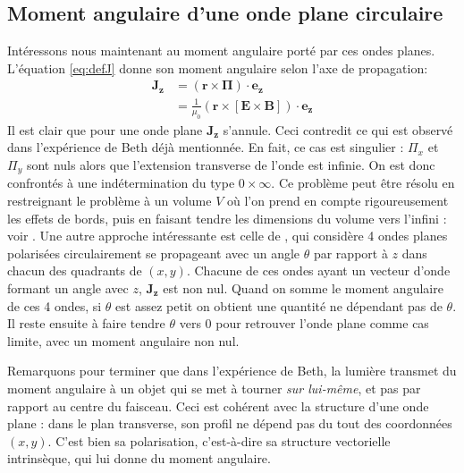 \subsection{Moment angulaire d'une onde plane circulaire}
\label{sec:ma_circ}
Intéressons nous maintenant au moment angulaire porté par ces ondes planes. L'équation \ref{eq:defJ} donne son moment angulaire selon l'axe de propagation: 
\begin{align}
\bm{J_z}&=(\bm{r}\times\bm{\Pi})\cdot\bm{e_z}\\
&=\frac{1}{\mu_0}(\bm{r}\times[\bm{E}\times\bm{B}])\cdot\bm{e_z}
\end{align}
Il est clair que pour une onde plane $\bm{J_z}$ s'annule. Ceci contredit ce qui est observé dans l'expérience de Beth  déjà mentionnée. En fait, ce cas est singulier : $\Pi_x$ et $\Pi_y $ sont nuls alors que l'extension transverse de l'onde est infinie. On est donc confrontés à une indétermination du type $0\times \infty$. 
Ce problème peut être résolu en restreignant le problème à un volume $V$ où l'on prend en compte rigoureusement les effets de bords, puis en faisant tendre les dimensions du volume vers l'infini : voir . Une autre approche intéressante est celle de , qui considère 4 ondes planes polarisées circulairement se propageant avec un angle $\theta$ par rapport à $z$ dans chacun des quadrants de $(x,y)$. Chacune de ces ondes ayant un vecteur d'onde formant un angle avec $z$, $\bm{J_z}$ est non nul. Quand on somme le moment angulaire de ces 4 ondes, si $\theta$ est assez petit on obtient une quantité ne dépendant pas de $\theta$. Il reste ensuite à faire tendre $\theta$ vers 0 pour retrouver l'onde plane comme cas limite, avec un moment angulaire non nul.

Remarquons pour terminer que dans l'expérience de Beth, la lumière transmet du moment angulaire à un objet qui se met à tourner \textit{sur lui-même}, et pas par rapport au centre du faisceau. Ceci est cohérent avec la structure d'une onde plane : dans le plan transverse, son profil ne dépend pas du tout des coordonnées $(x,y)$. C'est bien sa polarisation, c'est-à-dire sa structure vectorielle intrinsèque, qui lui donne du moment angulaire. 

